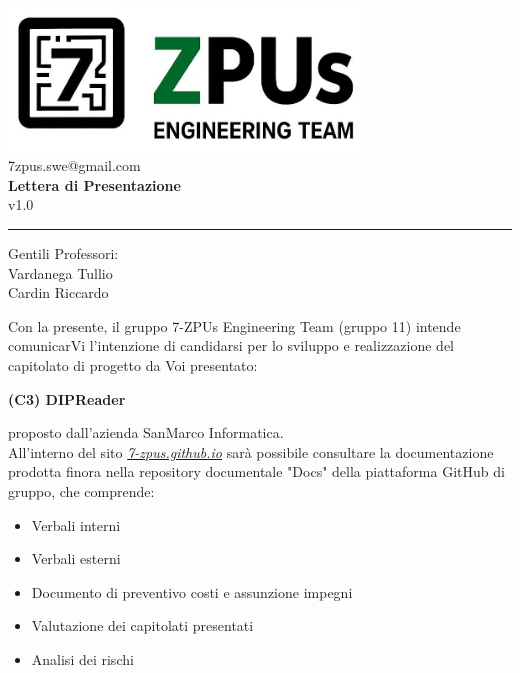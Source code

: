 \documentclass[a4paper,12pt]{article}
\begin{document}
\begin{center}
    \includegraphics[width=9.5cm]{../assets/logo7ZPUS.jpg}\\
    \small\hspace{10cm} 7zpus.swe@gmail.com\\
    \vspace{0.5cm}
    \Large \textbf{Lettera di Presentazione}\\
    \small\hspace{15cm} v1.0\\
\end{center}

\vspace{0.2cm}
\hrule
\vspace{0.7cm}

\begin{flushright}
    Gentili Professori:\\
    \indent Vardanega Tullio\\
    \indent Cardin Riccardo\\
\end{flushright}

Con la presente, il gruppo 7-ZPUs Engineering Team (gruppo 11) intende comunicarVi l'intenzione di candidarsi per lo sviluppo e realizzazione del capitolato di progetto da Voi presentato:
\begin{center}
    \textbf{(C3) DIPReader}\\
\end{center}
proposto dall'azienda SanMarco Informatica.\\
All'interno del sito \href{https://7-zpus.github.io/Docs/}{\textit{7-zpus.github.io}} sarà possibile consultare la documentazione prodotta finora nella repository documentale "Docs" della piattaforma GitHub di gruppo, che comprende:
\begin{itemize}[noitemsep]
    \item Verbali interni
    \item Verbali esterni
    \item Documento di preventivo costi e assunzione impegni
    \item Valutazione dei capitolati presentati
    \item Analisi dei rischi
\end{itemize}
\end{document}
